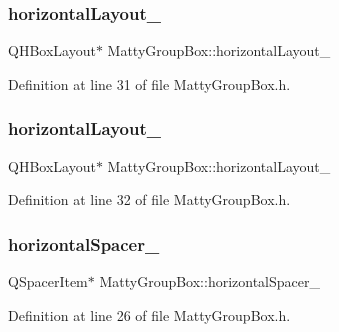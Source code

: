 \subsubsection{\texorpdfstring{horizontal\+Layout\+\_}{horizontalLayout\_1}}
{\footnotesize\ttfamily Q\+H\+Box\+Layout$\ast$ Matty\+Group\+Box\+::horizontal\+Layout\+\_\hspace{0.3cm}{\ttfamily [private]}}



Definition at line 31 of file Matty\+Group\+Box.\+h.

\hypertarget{classMattyGroupBox_a053f7794bcd10214414d41e9c09663e0}{}\label{classMattyGroupBox_a053f7794bcd10214414d41e9c09663e0} 
\subsubsection{\texorpdfstring{horizontal\+Layout\+\_}{horizontalLayout\_2}}
{\footnotesize\ttfamily Q\+H\+Box\+Layout$\ast$ Matty\+Group\+Box\+::horizontal\+Layout\+\_\hspace{0.3cm}{\ttfamily [private]}}



Definition at line 32 of file Matty\+Group\+Box.\+h.

\hypertarget{classMattyGroupBox_a6b2678b09a3c56c18f357775e83b76c0}{}\label{classMattyGroupBox_a6b2678b09a3c56c18f357775e83b76c0} 
\subsubsection{\texorpdfstring{horizontal\+Spacer\+\_}{horizontalSpacer\_1}}
{\footnotesize\ttfamily Q\+Spacer\+Item$\ast$ Matty\+Group\+Box\+::horizontal\+Spacer\+\_\hspace{0.3cm}{\ttfamily [private]}}



Definition at line 26 of file Matty\+Group\+Box.\+h.

\hypertarget{classMattyGroupBox_a633d989baf5de2db6d0c01702ba6b410}{}\label{classMattyGroupBox_a633d989baf5de2db6d0c01702ba6b410} 
